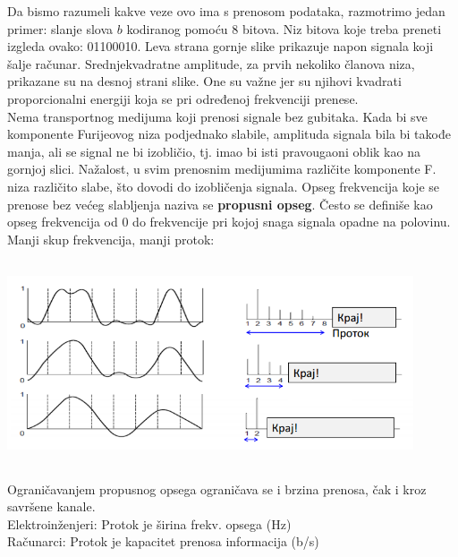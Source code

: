 \documentclass{article} %
\begin{document}
Da bismo razumeli kakve veze ovo ima s prenosom podataka, razmotrimo jedan primer: slanje slova $b$ kodiranog pomoću 8 bitova. Niz bitova koje treba preneti izgleda ovako: 01100010. Leva strana gornje slike prikazuje napon signala koji šalje računar. Srednjekvadratne amplitude, za prvih nekoliko članova niza, prikazane su na desnoj strani slike. One su važne jer su njihovi kvadrati proporcionalni energiji koja se pri određenoj frekvenciji prenese. \\

Nema transportnog medijuma koji prenosi signale bez gubitaka. Kada bi sve komponente Furijeovog niza podjednako slabile, amplituda signala bila bi takođe manja, ali se signal ne bi izobličio, tj. imao bi isti pravougaoni oblik kao na gornjoj slici. Nažalost, u svim prenosnim medijumima različite komponente F. niza različito slabe, što dovodi do izobličenja signala. Opseg frekvencija koje se prenose bez većeg slabljenja naziva se \textbf{propusni opseg}. Često se definiše kao opseg frekvencija od 0 do frekvencije pri kojoj snaga signala opadne na polovinu.
\\

Manji skup frekvencija, manji protok:
\begin{center}
\includegraphics[width=12cm, height=6cm]{furije3}\\
\end{center}

Ograničavanjem propusnog opsega ograničava se i brzina prenosa, čak i kroz savršene kanale.\\
Elektroinženjeri: Protok  je širina frekv. opsega (Hz)\\
Računarci: Protok je kapacitet prenosa informacija (b/s)
\end{document}
